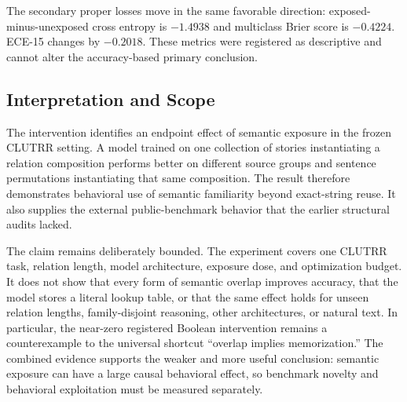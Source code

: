The secondary proper losses move in the same favorable direction:
exposed-minus-unexposed cross entropy is $-1.4938$ and multiclass Brier score
is $-0.4224$.  ECE-15 changes by $-0.2018$.  These metrics were registered as
descriptive and cannot alter the accuracy-based primary conclusion.

\subsection{Interpretation and Scope}

The intervention identifies an endpoint effect of semantic exposure in the
frozen CLUTRR setting.  A model trained on one collection of stories
instantiating a relation composition performs better on different source
groups and sentence permutations instantiating that same composition.  The
result therefore demonstrates behavioral use of semantic familiarity beyond
exact-string reuse.  It also supplies the external public-benchmark behavior
that the earlier structural audits lacked.

The claim remains deliberately bounded.  The experiment covers one CLUTRR
task, relation length, model architecture, exposure dose, and optimization
budget.  It does not show that every form of semantic overlap improves
accuracy, that the model stores a literal lookup table, or that the same
effect holds for unseen relation lengths, family-disjoint reasoning, other
architectures, or natural text.  In particular, the near-zero registered
Boolean intervention remains a counterexample to the universal shortcut
``overlap implies memorization.''  The combined evidence supports the weaker
and more useful conclusion: semantic exposure can have a large causal
behavioral effect, so benchmark novelty and behavioral exploitation must be
measured separately.
